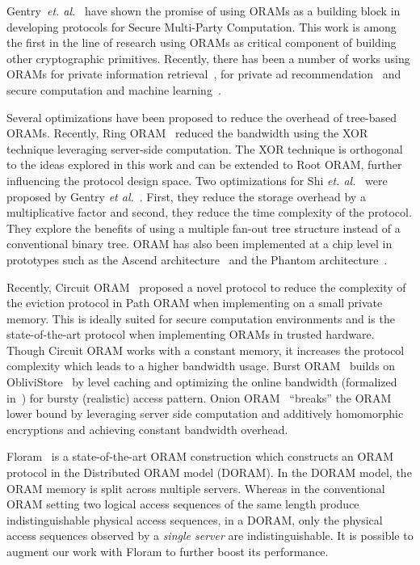 \documentclass[USenglish,oneside,twocolumn]{article}
\newcommand{\ourprotocol}{Root ORAM}
\begin{document}
Gentry~\textit{et. al.}~\cite{gentryoramSC} have shown the promise of using ORAMs as a building block in developing protocols for Secure Multi-Party Computation. This work is among the first in the line of research using ORAMs as critical component of building other cryptographic primitives. Recently, there has been a number of works using ORAMs for private information retrieval~\cite{moreno2015privacy, bajaj2011trusteddb, williams2008usable,mayberry2014efficient}, for private ad recommendation~\cite{backes2012obliviad} and secure computation and machine learning~\cite{scoram, oblivm, secureml, gentryoramSC}.

Several optimizations have been proposed to reduce the overhead of tree-based ORAMs. Recently, Ring ORAM~\cite{ringoram} reduced the bandwidth using the XOR technique leveraging server-side computation. The XOR technique is orthogonal to the ideas explored in this work and can be extended to \ourprotocol{},
further influencing the protocol design space. Two optimizations for Shi \textit{et. al.}~\cite{tree_based_orams} were proposed by Gentry \textit{et al.}~\cite{gentryoramSC}. First, they reduce the storage overhead by a multiplicative factor and second, they reduce the time complexity of the protocol. They explore the benefits of using a multiple fan-out tree structure instead of a conventional binary tree. ORAM has also been implemented at a chip level in prototypes such as the Ascend architecture~\cite{fletcher2012secure} and the Phantom architecture~\cite{maas2013phantom}. 




Recently, Circuit ORAM~\cite{circuitoram} proposed a novel protocol to reduce the complexity of the eviction protocol in Path ORAM when implementing on a small private memory. This is ideally suited for secure computation environments and is the state-of-the-art protocol when implementing ORAMs in trusted hardware. Though Circuit ORAM works with a constant memory, it increases the protocol complexity which leads to a higher bandwidth usage. Burst ORAM~\cite{burstoram} builds on ObliviStore~\cite{oblivistore} by level caching and optimizing the online bandwidth (formalized in~\cite{boneh2011remote}) for bursty (realistic) access pattern. Onion ORAM~\cite{onionoram} ``breaks'' the ORAM lower bound by leveraging server side computation and additively homomorphic encryptions and achieving constant bandwidth overhead. 

Floram~\cite{floram} is a state-of-the-art ORAM construction which constructs an ORAM protocol in the Distributed ORAM model (DORAM). In the DORAM model, the ORAM memory is split across multiple servers. Whereas in the conventional ORAM setting two logical access sequences of the same length produce indistinguishable physical access sequences, in a DORAM, only the physical access sequences observed by a \textit{single server} are indistinguishable. It is possible to augment our work with Floram to further boost its performance.
\end{document}
